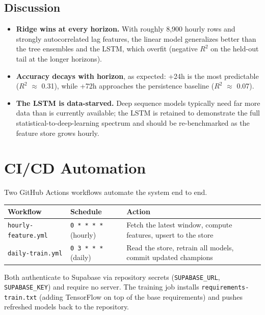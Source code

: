\documentclass[11pt,a4paper]{article}
\newcommand{\rsq}{$R^2$}
\begin{document}
\subsection{Discussion}
\begin{itemize}[leftmargin=1.4em]
  \item \textbf{Ridge wins at every horizon.} With roughly 8,900 hourly rows and
        strongly autocorrelated lag features, the linear model generalizes
        better than the tree ensembles and the LSTM, which overfit (negative
        \rsq{} on the held-out tail at the longer horizons).
  \item \textbf{Accuracy decays with horizon}, as expected: +24h is the most
        predictable (\rsq{} $\approx$ 0.31), while +72h approaches the
        persistence baseline (\rsq{} $\approx$ 0.07).
  \item \textbf{The LSTM is data-starved.} Deep sequence models typically need
        far more data than is currently available; the LSTM is retained to
        demonstrate the full statistical-to-deep-learning spectrum and should be
        re-benchmarked as the feature store grows hourly.
\end{itemize}

\section{CI/CD Automation}
Two GitHub Actions workflows automate the system end to end.

\begin{center}
\begin{tabular}{@{}p{3.6cm}p{3.2cm}p{6.4cm}@{}}
\toprule
\textbf{Workflow} & \textbf{Schedule} & \textbf{Action} \\
\midrule
\texttt{hourly-feature.yml} & \texttt{0 * * * *} (hourly) & Fetch the latest window, compute features, upsert to the store \\
\texttt{daily-train.yml} & \texttt{0 3 * * *} (daily) & Read the store, retrain all models, commit updated champions \\
\bottomrule
\end{tabular}
\end{center}

Both authenticate to Supabase via repository secrets
(\texttt{SUPABASE\_URL}, \texttt{SUPABASE\_KEY}) and require no server. The
training job installs \texttt{requirements-train.txt} (adding TensorFlow on top
of the base requirements) and pushes refreshed models back to the repository.
\end{document}
